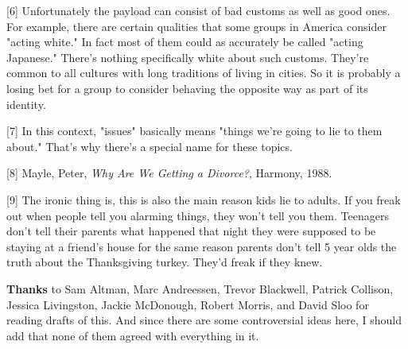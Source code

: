 [6] Unfortunately the payload can consist of bad customs as
                  well as good ones. For example, there are certain qualities
                  that some groups in America consider "acting white." In fact
                  most of them could as accurately be called "acting Japanese."
                  There's nothing specifically white about such customs. They're
                  common to all cultures with long traditions of living in
                  cities. So it is probably a losing bet for a group to consider
                  behaving the opposite way as part of its identity.

[7] In this context, "issues" basically means "things we're
                  going to lie to them about." That's why there's a special name
                  for these topics.

[8] Mayle, Peter, \emph{Why Are We Getting a Divorce?},
                  Harmony, 1988.

[9] The ironic thing is, this is also the main reason kids lie
                  to adults. If you freak out when people tell you alarming
                  things, they won't tell you them. Teenagers don't tell their
                  parents what happened that night they were supposed to be
                  staying at a friend's house for the same reason parents don't
                  tell 5 year olds the truth about the Thanksgiving turkey.
                  They'd freak if they knew.


                  \textbf{Thanks} to Sam Altman, Marc Andreessen, Trevor
                  Blackwell, Patrick Collison, Jessica Livingston, Jackie
                  McDonough, Robert Morris, and David Sloo for reading drafts of
                  this. And since there are some controversial ideas here, I
                  should add that none of them agreed with everything in it.


              
            
          
